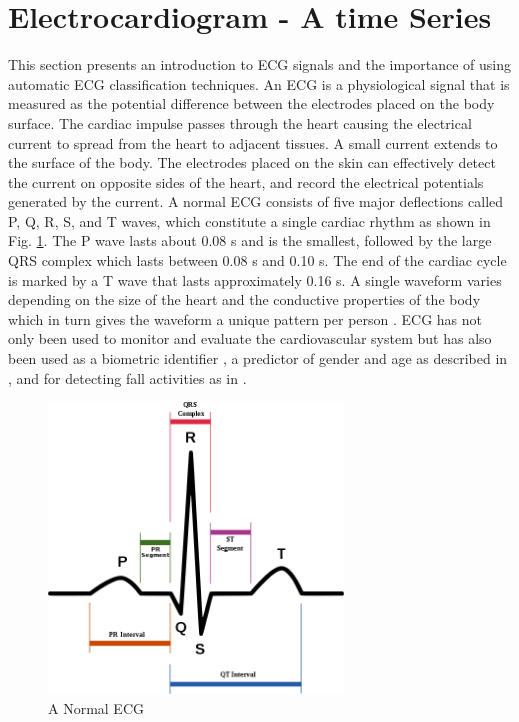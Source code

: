 \documentclass{ieeeaccess}
\newcommand{\todo}[1]{\textbf{\ \textcolor{red}{#1}}}
\begin{document}
\section{Electrocardiogram - A time Series}
This section presents an introduction to ECG signals and the importance of using automatic ECG classification techniques.
An ECG is a physiological signal that is measured as the potential difference between the electrodes placed on the body surface. The cardiac impulse passes through the heart causing the electrical current to spread
from the heart to adjacent tissues. A small current extends to the surface of the body. The electrodes placed on the skin can effectively detect the current on opposite sides of the heart, and record the electrical potentials generated by the current. A normal ECG consists of five major deflections called P, Q, R, S, and T waves, which constitute a single cardiac rhythm as shown in Fig. \ref{fig:ECG}. The P wave lasts about 0.08 s and is the smallest, followed by the large QRS complex which lasts between 0.08 s and 0.10 s. The end of the cardiac cycle is marked by a T wave that lasts approximately 0.16 s. A single waveform varies depending on the size of the heart and the conductive properties of the body which in turn gives the waveform a unique pattern per person \cite{7164783}. ECG has not only been used to monitor and evaluate the cardiovascular system but has also been used as a biometric identifier \cite{9123339}, a predictor of gender and age as described in \cite{cite-key}, and for detecting fall activities as in \cite{2021}.
\begin{figure}[ht]	
\caption{A Normal ECG} %
\label{fig:ECG}
\centerline{\includegraphics[width=18.5pc]{Definitions/ecgNormal.png}}
\end{figure}
\end{document}
